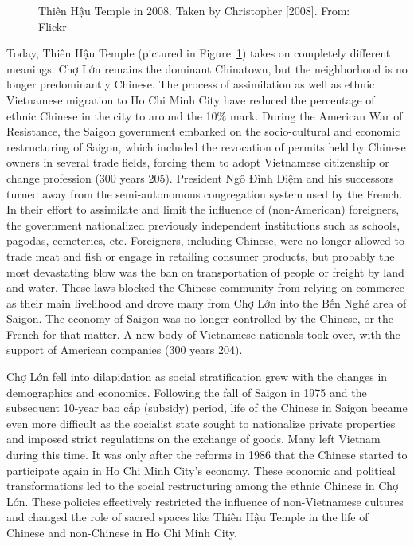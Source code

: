 \begin{figure}[!ht]
\begin{center}
\vspace{-.2 in}
\caption[\vi Thiên Hậu Temple in 2008 \en]{\vi Thiên Hậu Temple in 2008. Taken by Christopher [2008]. From: Flickr \en}\label{thienhau_present}
\end{center}
\vspace{-.2 in}
\end{figure}

\vi Today, Thiên Hậu Temple (pictured in Figure~\ref{thienhau_present}) takes on completely different meanings. Chợ Lớn remains the dominant Chinatown, but the neighborhood is no longer predominantly Chinese. The process of assimilation as well as ethnic Vietnamese migration to Ho Chi Minh City have reduced the percentage of ethnic Chinese in the city to around the 10\% mark.  During the American War of Resistance, the Saigon government embarked on the socio-cultural and economic restructuring of Saigon, which included the revocation of permits held by Chinese owners in several trade fields, forcing them to adopt  Vietnamese citizenship or change profession (300 years 205). President Ngô Đình Diệm and his successors turned away from the semi-autonomous congregation system used by the French. In their effort to assimilate and limit the influence of (non-American) foreigners, the government nationalized previously independent institutions such as schools, pagodas, cemeteries, etc.  Foreigners, including Chinese, were no longer allowed to trade meat and fish or engage in retailing consumer products, but probably the most devastating blow was the ban on transportation of people or freight by land and water. These laws blocked the Chinese community from relying on commerce as their main livelihood and drove many from Chợ Lớn into the Bến Nghé area of Saigon. The economy of Saigon was no longer controlled by the Chinese, or the French for that matter. A new body of Vietnamese nationals took over, with the support of American companies (300 years 204).

Chợ Lớn fell into dilapidation as  social stratification grew with the changes in demographics and economics. Following the fall of Saigon in 1975 and the subsequent 10-year bao cấp (subsidy) period, life of the Chinese in Saigon became even more difficult as the socialist state sought to nationalize private properties and imposed strict regulations on the exchange of goods.  Many left Vietnam during this time. It was only after the reforms in 1986 that the Chinese started to participate again in Ho Chi Minh City’s economy. These economic and political transformations led to the social restructuring among the ethnic Chinese in Chợ Lớn. These policies effectively restricted the influence of non-Vietnamese cultures and changed the role of sacred spaces like Thiên Hậu Temple in the life of Chinese and non-Chinese in Ho Chi Minh City.

